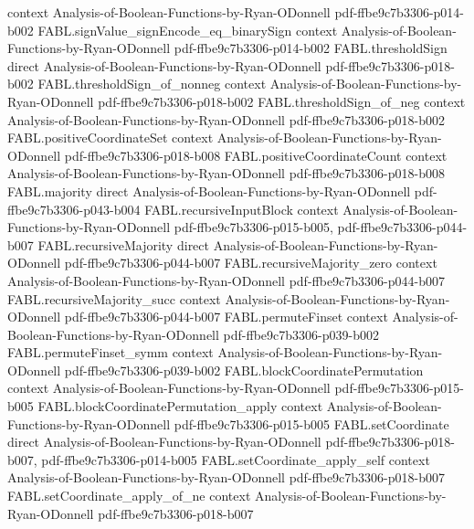 \begin{theorem}
  {context}
  {Analysis-of-Boolean-Functions-by-Ryan-ODonnell}
  {pdf-ffbe9c7b3306-p014-b002}
\proofstep
  {FABL.signValue_signEncode_eq_binarySign}
  {context}
  {Analysis-of-Boolean-Functions-by-Ryan-ODonnell}
  {pdf-ffbe9c7b3306-p014-b002}
\proofstep
  {FABL.thresholdSign}
  {direct}
  {Analysis-of-Boolean-Functions-by-Ryan-ODonnell}
  {pdf-ffbe9c7b3306-p018-b002}
\proofstep
  {FABL.thresholdSign_of_nonneg}
  {context}
  {Analysis-of-Boolean-Functions-by-Ryan-ODonnell}
  {pdf-ffbe9c7b3306-p018-b002}
\proofstep
  {FABL.thresholdSign_of_neg}
  {context}
  {Analysis-of-Boolean-Functions-by-Ryan-ODonnell}
  {pdf-ffbe9c7b3306-p018-b002}
\proofstep
  {FABL.positiveCoordinateSet}
  {context}
  {Analysis-of-Boolean-Functions-by-Ryan-ODonnell}
  {pdf-ffbe9c7b3306-p018-b008}
\proofstep
  {FABL.positiveCoordinateCount}
  {context}
  {Analysis-of-Boolean-Functions-by-Ryan-ODonnell}
  {pdf-ffbe9c7b3306-p018-b008}
\proofstep
  {FABL.majority}
  {direct}
  {Analysis-of-Boolean-Functions-by-Ryan-ODonnell}
  {pdf-ffbe9c7b3306-p043-b004}
\proofstep
  {FABL.recursiveInputBlock}
  {context}
  {Analysis-of-Boolean-Functions-by-Ryan-ODonnell}
  {pdf-ffbe9c7b3306-p015-b005,
    pdf-ffbe9c7b3306-p044-b007}
\proofstep
  {FABL.recursiveMajority}
  {direct}
  {Analysis-of-Boolean-Functions-by-Ryan-ODonnell}
  {pdf-ffbe9c7b3306-p044-b007}
\proofstep
  {FABL.recursiveMajority_zero}
  {context}
  {Analysis-of-Boolean-Functions-by-Ryan-ODonnell}
  {pdf-ffbe9c7b3306-p044-b007}
\proofstep
  {FABL.recursiveMajority_succ}
  {context}
  {Analysis-of-Boolean-Functions-by-Ryan-ODonnell}
  {pdf-ffbe9c7b3306-p044-b007}
\proofstep
  {FABL.permuteFinset}
  {context}
  {Analysis-of-Boolean-Functions-by-Ryan-ODonnell}
  {pdf-ffbe9c7b3306-p039-b002}
\proofstep
  {FABL.permuteFinset_symm}
  {context}
  {Analysis-of-Boolean-Functions-by-Ryan-ODonnell}
  {pdf-ffbe9c7b3306-p039-b002}
\proofstep
  {FABL.blockCoordinatePermutation}
  {context}
  {Analysis-of-Boolean-Functions-by-Ryan-ODonnell}
  {pdf-ffbe9c7b3306-p015-b005}
\proofstep
  {FABL.blockCoordinatePermutation_apply}
  {context}
  {Analysis-of-Boolean-Functions-by-Ryan-ODonnell}
  {pdf-ffbe9c7b3306-p015-b005}
\proofstep
  {FABL.setCoordinate}
  {direct}
  {Analysis-of-Boolean-Functions-by-Ryan-ODonnell}
  {pdf-ffbe9c7b3306-p018-b007,
    pdf-ffbe9c7b3306-p014-b005}
\proofstep
  {FABL.setCoordinate_apply_self}
  {context}
  {Analysis-of-Boolean-Functions-by-Ryan-ODonnell}
  {pdf-ffbe9c7b3306-p018-b007}
\proofstep
  {FABL.setCoordinate_apply_of_ne}
  {context}
  {Analysis-of-Boolean-Functions-by-Ryan-ODonnell}
  {pdf-ffbe9c7b3306-p018-b007}
\proofstep

\end{theorem}
